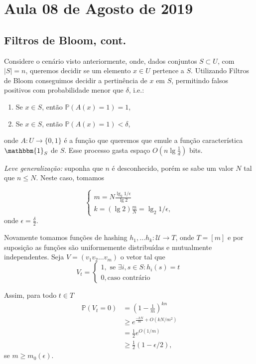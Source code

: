 \section{Aula 08 de Agosto de 2019}
\label{2019_08_08}

\subsection{Filtros de Bloom, cont.}
Considere o cenário visto anteriormente, onde, dados conjuntos $S\subset
U$, com $|S|=n$, queremos decidir se um elemento $x\in U$ pertence a $S$.
Utilizando Filtros de Bloom conseguimos decidir a pertinência de $x$ em
$S$, permitindo falsos positivos com probabilidade menor que $\delta$,
i.e.:
\begin{enumerate}
    \item Se $x\in S$, então $\mathbb{P}(A(x)=1)=1$,
    \item Se $x\in S$, então $\mathbb{P}(A(x)=1)< \delta$,
\end{enumerate}

onde $A:U \to \{0,1\}$ \'e a fun\c{c}\~ao que queremos que emule a
fun\c{c}\~ao caracter\'istica $\mathbbm{1}_S$ de $S$. 
Esse processo gasta
espa\c{c}o $O(n \lg{\frac{1}{d}})$ bits.

\textit{Leve generaliza\c{c}\~ao:} suponha que $n$ \'e desconhecido, por\'em se sabe um valor $N$ tal que $n \le N$. Neste caso, tomamos

\[\begin{cases}
m = N \frac{\lg_2{1/\epsilon}}{\lg 2}
\\k= (\lg 2)\frac{m}{N}= \lg_2{1/\epsilon},
\end{cases}
\]
onde  $\epsilon = \frac{\delta}{2}$.

Novamente tomamos fun\c{c}\~oes de hashing $h_1,\dots h_k: \mathcal{U}
\to T$, onde $T = [m]$ e por suposi\c{c}\~ao as fun\c{c}\~oes s\~ao
uniformemente distribu\'idas e mutualmente independentes. 
Seja 
$V=(v_1 v_2 \dots v_m)$ o vetor tal que 
\[V_t = \begin{cases}
1, \text{ se } \exists i, s\in S: h_i(s)=t
\\0, \text{caso contr\'ario}
\end{cases}\]

Assim, para todo $t\in T$
\begin{align*}
  \mathbb{P}(V_t=0)&= \left(1-\frac{1}{m}\right)^{kn}\\
                    &\ge e^{\frac{-kN}{m}+O(kN/m^2)}\\
                    &=\frac{1}{2}e^{O(1/m)}\\
                    &\ge \frac{1}{2}(1-\epsilon/2),
\end{align*}
se $m\ge m_0(\epsilon)$.

